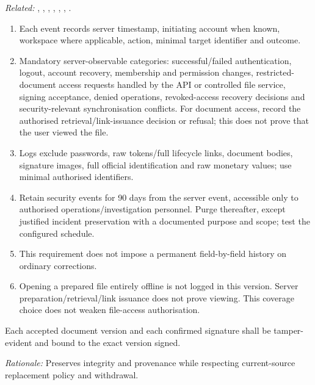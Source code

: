 \textit{Related:} \hyperref[fr:003]{}, \hyperref[fr:005]{}, \hyperref[fr:007]{}, \hyperref[fr:008]{}, \hyperref[fr:036]{}, \hyperref[fr:037]{}, \hyperref[fr:042]{}.
\begin{enumerate}[label=(\alph*),leftmargin=*,itemsep=1pt,topsep=3pt]
\item Each event records server timestamp, initiating account when known, workspace where applicable, action, minimal target identifier and outcome.
\item Mandatory server-observable categories: successful/failed authentication, logout, account recovery, membership and permission changes, restricted-document access requests handled by the API or controlled file service, signing acceptance, denied operations, revoked-access recovery decisions and security-relevant synchronisation conflicts. For document access, record the authorised retrieval/link-issuance decision or refusal; this does not prove that the user viewed the file.
\item Logs exclude passwords, raw tokens/full lifecycle links, document bodies, signature images, full official identification and raw monetary values; use minimal authorised identifiers.
\item Retain security events for 90 days from the server event, accessible only to authorised operations/investigation personnel. Purge thereafter, except justified incident preservation with a documented purpose and scope; test the configured schedule.
\item This requirement does not impose a permanent field-by-field history on ordinary corrections.
\item Opening a prepared file entirely offline is not logged in this version. Server preparation/retrieval/link issuance does not prove viewing. This coverage choice does not weaken file-access authorisation.
\end{enumerate}

\label{nfr:SEC-08}
Each accepted document version and each confirmed signature shall be tamper-evident and bound to the exact version signed.

\textit{Rationale:} Preserves integrity and provenance while respecting current-source replacement policy and withdrawal.

